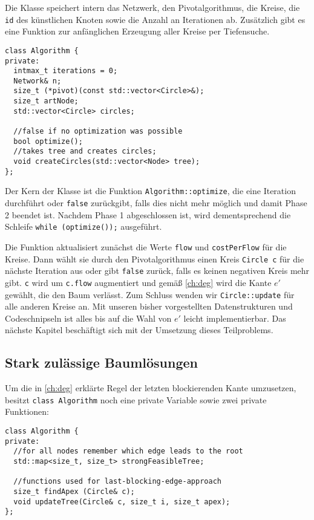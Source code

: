 Die Klasse speichert intern das Netzwerk, den Pivotalgorithmus, die Kreise, die \lstinline|id| des künstlichen Knoten sowie die Anzahl an Iterationen ab. Zusätzlich gibt es eine Funktion zur anfänglichen Erzeugung aller Kreise per Tiefensuche.

\begin{lstlisting}
class Algorithm {
private:
  intmax_t iterations = 0;
  Network& n;
  size_t (*pivot)(const std::vector<Circle>&);
  size_t artNode;
  std::vector<Circle> circles;

  //false if no optimization was possible
  bool optimize();
  //takes tree and creates circles;
  void createCircles(std::vector<Node> tree);
};
\end{lstlisting}

Der Kern der Klasse ist die Funktion \lstinline|Algorithm::optimize|, die eine Iteration durchführt oder \lstinline|false| zurückgibt, falls dies nicht mehr möglich und damit Phase 2 beendet ist. Nachdem Phase 1 abgeschlossen ist, wird dementsprechend die Schleife \lstinline|while (optimize());| ausgeführt.
 
Die Funktion aktualisiert zunächst die Werte \lstinline|flow| und \lstinline|costPerFlow| für die Kreise. Dann wählt sie durch den Pivotalgorithmus einen Kreis \lstinline|Circle c| für die nächste Iteration aus oder gibt \lstinline|false| zurück, falls es keinen negativen Kreis mehr gibt. \lstinline|c| wird um \lstinline|c.flow| augmentiert und gemäß \cref{ch:deg} wird die Kante $e'$ gewählt, die den Baum verlässt. Zum Schluss wenden wir \lstinline|Circle::update| für alle anderen Kreise an. Mit unseren bisher vorgestellten Datenstrukturen und Codeschnipseln ist alles bis auf die Wahl von $e'$ leicht implementierbar. Das nächste Kapitel beschäftigt sich mit der Umsetzung dieses Teilproblems.

\subsection{Stark zulässige Baumlösungen}\label{ch:szBL}
Um die in \cref{ch:deg} erklärte Regel der letzten blockierenden Kante umzusetzen, besitzt \lstinline|class Algorithm| noch eine private Variable sowie zwei private Funktionen:

\begin{lstlisting}
class Algorithm {
private:
  //for all nodes remember which edge leads to the root
  std::map<size_t, size_t> strongFeasibleTree;
  
  //functions used for last-blocking-edge-approach
  size_t findApex (Circle& c);
  void updateTree(Circle& c, size_t i, size_t apex);
};
\end{lstlisting}

